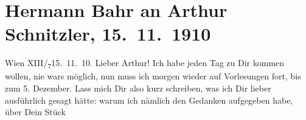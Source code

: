 

         
         \renewcommand{\erwaehntePersonen}{Personen: Hermann Bahr, Anna Bahr-Mildenburg, Lisa Clarus, Alfred Gerasch, Olga Schnitzler}
         \renewcommand{\erwaehnteInstitutionen}{Institutionen: Neues Wiener Journal}
         \renewcommand{\erwaehnteOrte}{Orte: Burgtheater, London, Ober Sankt Veit, Wien}
         \renewcommand{\erwaehnteWerke}{Werke: Der junge Medardus. Dramatische Historie in einem Vorspiel und fünf Aufzügen, Fremden-Blatt}
               \section[Hermann Bahr an Arthur Schnitzler, 15. 11. 1910]{ Hermann Bahr an Arthur Schnitzler, 15. 11. 1910}\nopagebreak{}\rehead{ }\begin{ledgroupsized}[t]{13cm}\normalsize\beginnumbering \toendnotes[C]{\smallbreak\pagebreak[2]} 
\toendnotes[C]{\smallbreak}\pstart
           \raggedleft{}{\pb}Wien XIII/\textsubscript{7}\hspace*{2.5em}15. 11. 10.\pend
           \pstart\center{}Lieber Arthur!\pend\pstart
           Ich habe jeden Tag zu Dir kommen wollen, nie wars möglich, nun muss ich morgen wieder
               auf Vorlesungen fort, bis zum 5. Dezember.\pend
           \pstart
           Lass mich Dir also kurz schreiben, was ich Dir lieber ausführlich gesagt hätte: warum
               ich nämlich den Gedanken aufgegeben habe, über Dein Stück
\end{ledgroupsized}
